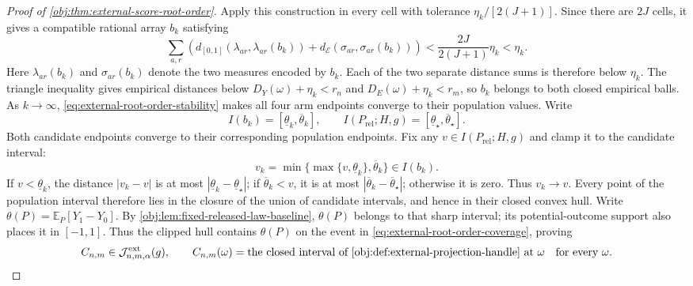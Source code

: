 \documentclass[11pt]{article}
\begin{document}
\begin{proof}[Proof of \cref{obj:thm:external-score-root-order}]
Apply this construction in every cell with tolerance \(\eta_k/[2(J+1)]\). Since there are \(2J\) cells, it gives a compatible rational array \(b_k\) satisfying
\[
\sum_{a,r}\!\left(d_{[0,1]}(\lambda_{ar},\lambda_{ar}(b_k))
+d_{\mathcal E}(\sigma_{ar},\sigma_{ar}(b_k))\right)
<\frac{2J}{2(J+1)}\eta_k<\eta_k.
\]
Here \(\lambda_{ar}(b_k)\) and \(\sigma_{ar}(b_k)\) denote the two measures encoded by \(b_k\). Each of the two separate distance sums is therefore below \(\eta_k\). The triangle inequality gives empirical distances below \(D_Y(\omega)+\eta_k<r_n\) and \(D_E(\omega)+\eta_k<r_m\), so \(b_k\) belongs to both closed empirical balls. As \(k\to\infty\), \cref{eq:external-root-order-stability} makes all four arm endpoints converge to their population values. Write
\[
I(b_k)=[\underline\theta_k,\overline\theta_k],
\qquad
I(P_{\mathrm{rel}};H,g)=[\underline\theta_\star,\overline\theta_\star].
\]
Both candidate endpoints converge to their corresponding population endpoints. Fix any \(v\in I(P_{\mathrm{rel}};H,g)\) and clamp it to the candidate interval:
\[
v_k=\min\{\max\{v,\underline\theta_k\},\overline\theta_k\}\in I(b_k).
\]
If \(v<\underline\theta_k\), the distance \(|v_k-v|\) is at most \(|\underline\theta_k-\underline\theta_\star|\); if \(\overline\theta_k<v\), it is at most \(|\overline\theta_k-\overline\theta_\star|\); otherwise it is zero. Thus \(v_k\to v\). Every point of the population interval therefore lies in the closure of the union of candidate intervals, and hence in their closed convex hull. Write \(\theta(P)=\mathbb E_P[Y_1-Y_0]\). By \cref{obj:lem:fixed-released-law-baseline}, \(\theta(P)\) belongs to that sharp interval; its potential-outcome support also places it in \([-1,1]\). Thus the clipped hull contains \(\theta(P)\) on the event in \cref{eq:external-root-order-coverage}, proving
\[
C_{n,m}\in\mathcal J^{\mathrm{ext}}_{n,m,\alpha}(g),
\qquad
C_{n,m}(\omega)=\text{the closed interval of \cref{obj:def:external-projection-handle} at }\omega
\quad\text{for every }\omega. \label{eq:external-root-order-honesty}
\]


\end{proof}
\end{document}
